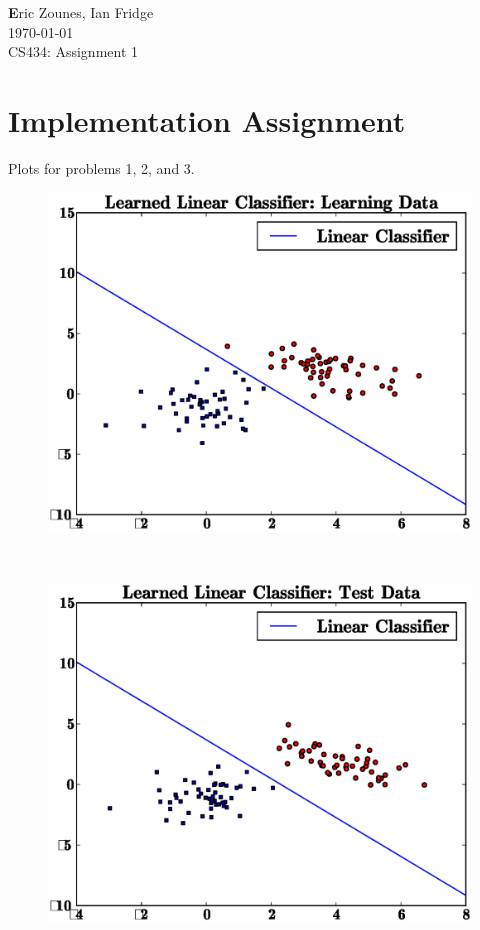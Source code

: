 \documentclass[letterpaper,10pt,titlepage]{article}
\begin{document}
\textbf Eric Zounes, Ian Fridge \\
\today  \\
CS434: Assignment 1\\[10mm]
\section[1.]{Implementation Assignment} 
\large Plots for problems 1, 2, and 3. \\ 
\begin{figure}[th!]
\centering
\includegraphics[width=5in]{learn.eps} 
\end{figure} 
\\[5mm]
\begin{figure}[th!]
\centering
\includegraphics[width=5in]{test.eps} 
\end{figure} 
\end{document}

